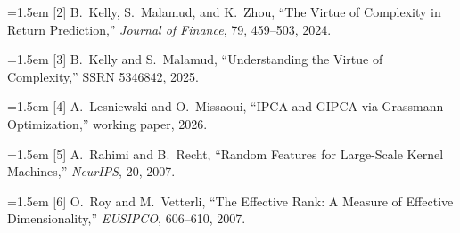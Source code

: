 \documentclass[11pt, a4paper]{article}
\begin{document}
\noindent\hangindent=1.5em
[2]\label{KMZ2024} B.~Kelly, S.~Malamud, and K.~Zhou,
``The Virtue of Complexity in Return Prediction,''
\textit{Journal of Finance}, 79, 459--503, 2024.

\noindent\hangindent=1.5em
[3]\label{KM2025} B.~Kelly and S.~Malamud,
``Understanding the Virtue of Complexity,''
SSRN 5346842, 2025.

\noindent\hangindent=1.5em
[4]\label{LM2026} A.~Lesniewski and O.~Missaoui,
``IPCA and GIPCA via Grassmann Optimization,'' working paper, 2026.

\noindent\hangindent=1.5em
[5]\label{RR2007} A.~Rahimi and B.~Recht,
``Random Features for Large-Scale Kernel Machines,''
\textit{NeurIPS}, 20, 2007.

\noindent\hangindent=1.5em
[6]\label{RV2007} O.~Roy and M.~Vetterli,
``The Effective Rank: A Measure of Effective Dimensionality,''
\textit{EUSIPCO}, 606--610, 2007.

\endgroup
\end{document}
